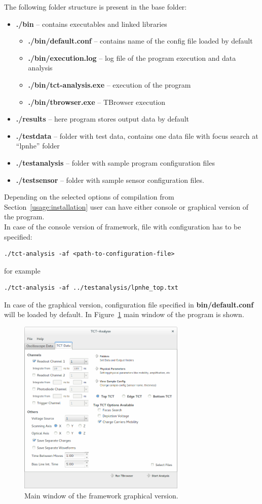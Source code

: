 \documentclass[12pt,oneside,notitlepage,abstracton,a4paper]{scrartcl}
\begin{document}
The following folder structure is present in the base folder:
\begin{itemize}
\item \textbf{./bin} -- contains executables and linked libraries
\begin{itemize}
\item \textbf{./bin/default.conf} -- contains name of the config file loaded by default
\item \textbf{./bin/execution.log} -- log file of the program execution and data analysis
\item \textbf{./bin/tct-analysis.exe} -- execution of the program
\item \textbf{./bin/tbrowser.exe} -- TBrowser execution
\end{itemize}
\item \textbf{./results} -- here program stores output data by default
\item \textbf{./testdata} -- folder with test data, contains one data file with focus search at “lpnhe” folder
\item \textbf{./testanalysis} -- folder with sample program configuration files
\item \textbf{./testsensor} -- folder with sample sensor configuration files.
\end{itemize}
Depending on the selected options of compilation from Section~\ref{usage:installation} user can have either console or graphical version of the program.
\\ \indent In case of the console version of framework, file with configuration has to be specified: 
\begin{lstlisting}
./tct-analysis -af <path-to-configuration-file> 
\end{lstlisting}
for example 
\begin{lstlisting}
./tct-analysis -af ../testanalysis/lpnhe_top.txt
\end{lstlisting}

\indent In case of the graphical version, configuration file specified in \textbf{bin/default.conf} will be loaded by default. In Figure~\ref{fig:main} main window of the program is shown.

\begin{figure}[H]
    \centering
    \includegraphics[width=8cm]{pics/main_window}
    \caption{Main window of the framework graphical version.}
    \label{fig:main}
\end{figure}
\end{document}
